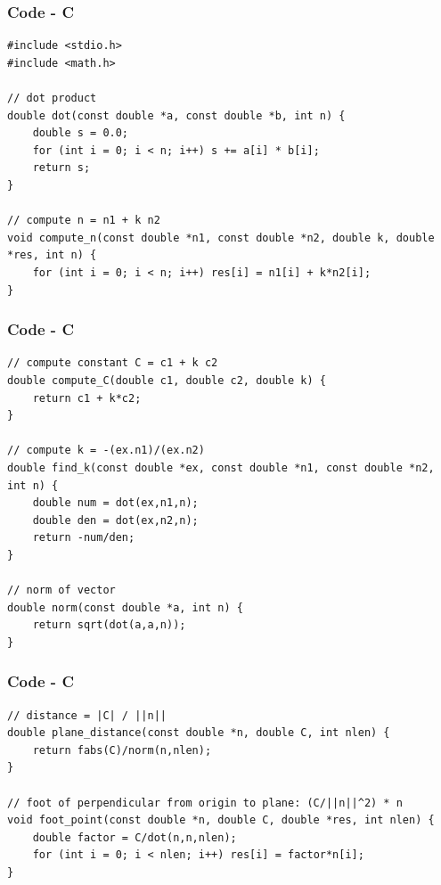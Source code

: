 \documentclass{beamer}
\theoremstyle{remark}
\numberwithin{equation}{section}
\begin{document}
\begin{frame}[fragile]
    \frametitle{Code - C}
    \begin{lstlisting}
#include <stdio.h>
#include <math.h>

// dot product
double dot(const double *a, const double *b, int n) {
    double s = 0.0;
    for (int i = 0; i < n; i++) s += a[i] * b[i];
    return s;
}

// compute n = n1 + k n2
void compute_n(const double *n1, const double *n2, double k, double *res, int n) {
    for (int i = 0; i < n; i++) res[i] = n1[i] + k*n2[i];
}
    \end{lstlisting}
    \end{frame}

    \begin{frame}[fragile]
    \frametitle{Code - C}
    \begin{lstlisting}
// compute constant C = c1 + k c2
double compute_C(double c1, double c2, double k) {
    return c1 + k*c2;
}

// compute k = -(ex.n1)/(ex.n2)
double find_k(const double *ex, const double *n1, const double *n2, int n) {
    double num = dot(ex,n1,n);
    double den = dot(ex,n2,n);
    return -num/den;
}

// norm of vector
double norm(const double *a, int n) {
    return sqrt(dot(a,a,n));
}

\end{lstlisting}
\end{frame}

    \begin{frame}[fragile]
    \frametitle{Code - C}
    \begin{lstlisting}
// distance = |C| / ||n||
double plane_distance(const double *n, double C, int nlen) {
    return fabs(C)/norm(n,nlen);
}

// foot of perpendicular from origin to plane: (C/||n||^2) * n
void foot_point(const double *n, double C, double *res, int nlen) {
    double factor = C/dot(n,n,nlen);
    for (int i = 0; i < nlen; i++) res[i] = factor*n[i];
}


\end{lstlisting}
\end{frame}
\end{document}
